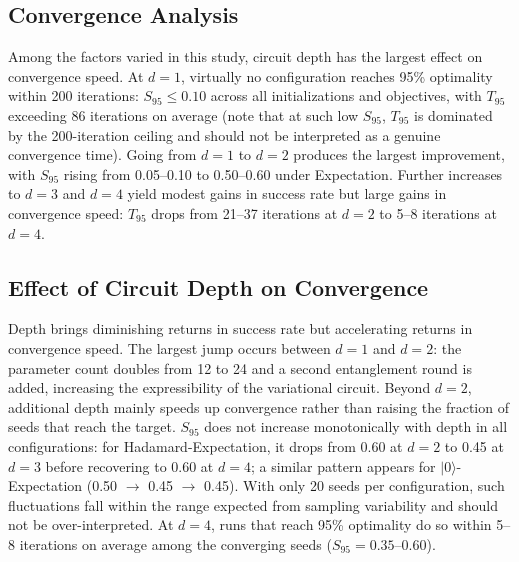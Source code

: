\documentclass[runningheads]{llncs}
\begin{document}
\subsection{Convergence Analysis}

Among the factors varied in this study, circuit depth has the largest effect on convergence speed. At $d = 1$, virtually no configuration reaches 95\% optimality within 200 iterations: $S_{95} \leq 0.10$ across all initializations and objectives, with $T_{95}$ exceeding 86 iterations on average (note that at such low $S_{95}$, $T_{95}$ is dominated by the 200-iteration ceiling and should not be interpreted as a genuine convergence time). Going from $d = 1$ to $d = 2$ produces the largest improvement, with $S_{95}$ rising from 0.05--0.10 to 0.50--0.60 under Expectation. Further increases to $d = 3$ and $d = 4$ yield modest gains in success rate but large gains in convergence speed: $T_{95}$ drops from 21--37 iterations at $d = 2$ to 5--8 iterations at $d = 4$.

\subsection{Effect of Circuit Depth on Convergence}
Depth brings diminishing returns in success rate but accelerating returns in convergence speed. The largest jump occurs between $d = 1$ and $d = 2$: the parameter count doubles from 12 to 24 and a second entanglement round is added, increasing the expressibility of the variational circuit. Beyond $d = 2$, additional depth mainly speeds up convergence rather than raising the fraction of seeds that reach the target. $S_{95}$ does not increase monotonically with depth in all configurations: for Hadamard-Expectation, it drops from 0.60 at $d = 2$ to 0.45 at $d = 3$ before recovering to 0.60 at $d = 4$; a similar pattern appears for $|0\rangle$-Expectation (0.50 $\to$ 0.45 $\to$ 0.45). With only 20 seeds per configuration, such fluctuations fall within the range expected from sampling variability and should not be over-interpreted. At $d = 4$, runs that reach 95\% optimality do so within 5--8 iterations on average among the converging seeds ($S_{95} = 0.35$--$0.60$).
\end{document}
